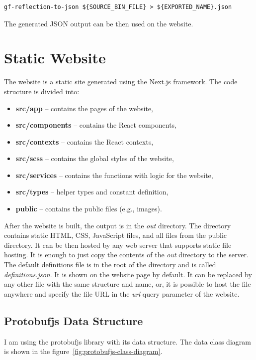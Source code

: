 \begin{lstlisting}[caption={proto-to-json command example}, label={lst:reflection-to-json}]
gf-reflection-to-json ${SOURCE_BIN_FILE} > ${EXPORTED_NAME}.json
\end{lstlisting}

The generated JSON output can be then used on the website.


\section{Static Website}
The website is a static site generated using the Next.js framework.
The code structure is divided into:
\begin{itemize}
    \item \textbf{src/app} -- contains the pages of the website,
    \item \textbf{src/components} -- contains the React components,
    \item \textbf{src/contexts} -- contains the React contexts,
    \item \textbf{src/scss} -- contains the global styles of the website,
    \item \textbf{src/services} -- contains the functions with logic for the website,
    \item \textbf{src/types} -- helper types and constant definition,
    \item \textbf{public} -- contains the public files (e.g., images).
\end{itemize}

After the website is built, the output is in the \textit{out} directory.
The directory contains static HTML, CSS, JavaScript files, and all files from the public directory.
It can be then hosted by any web server that supports static file hosting.
It is enough to just copy the contents of the \textit{out} directory to the server.
The default definitions file is in the root of the directory and is called \textit{definitions.json}.
It is shown on the website page by default.
It can be replaced by any other file with the same structure and name, or, it is possible to host the file anywhere and specify the file URL in the \textit{url} query parameter of the website.

\subsection{Protobufjs Data Structure}
I am using the protobufjs library with its data structure.
The data class diagram is shown in the figure~\ref{fig:protobufjs-class-diagram}.

